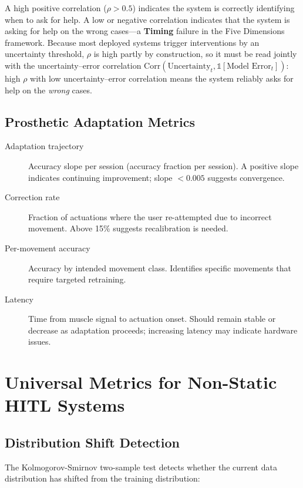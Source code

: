 A high positive correlation ($\rho > 0.5$) indicates the system is correctly identifying when to ask for help. A low or negative correlation indicates that the system is asking for help on the wrong cases---a \textbf{Timing} failure in the Five Dimensions framework. Because most deployed systems trigger interventions by an uncertainty threshold, $\rho$ is high partly by construction, so it must be read jointly with the uncertainty--error correlation $\text{Corr}(\text{Uncertainty}_t, \mathbb{1}[\text{Model Error}_t])$: high $\rho$ with low uncertainty--error correlation means the system reliably asks for help on the \emph{wrong} cases.

\subsection{Prosthetic Adaptation Metrics}

\begin{description}
    \item[Adaptation trajectory] Accuracy slope per session (accuracy fraction per session). A positive slope indicates continuing improvement; slope $< 0.005$ suggests convergence.
    \item[Correction rate] Fraction of actuations where the user re-attempted due to incorrect movement. Above 15\% suggests recalibration is needed.
    \item[Per-movement accuracy] Accuracy by intended movement class. Identifies specific movements that require targeted retraining.
    \item[Latency] Time from muscle signal to actuation onset. Should remain stable or decrease as adaptation proceeds; increasing latency may indicate hardware issues.
\end{description}

\section{Universal Metrics for Non-Static HITL Systems}

\subsection{Distribution Shift Detection}

The Kolmogorov-Smirnov two-sample test detects whether the current data distribution has shifted from the training distribution:

